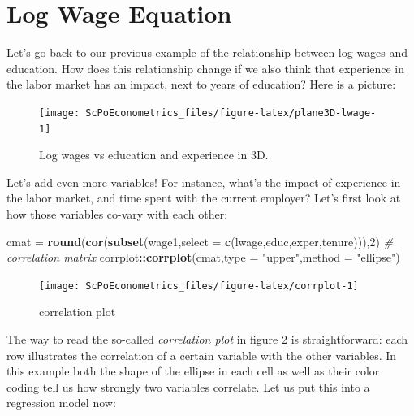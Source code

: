 \documentclass[]{book}
\newenvironment{Shaded}{\begin{snugshade}}{\end{snugshade}}
\newcommand{\KeywordTok}[1]{\textcolor[rgb]{0.13,0.29,0.53}{\textbf{#1}}}
\newcommand{\DataTypeTok}[1]{\textcolor[rgb]{0.13,0.29,0.53}{#1}}
\newcommand{\DecValTok}[1]{\textcolor[rgb]{0.00,0.00,0.81}{#1}}
\newcommand{\StringTok}[1]{\textcolor[rgb]{0.31,0.60,0.02}{#1}}
\newcommand{\CommentTok}[1]{\textcolor[rgb]{0.56,0.35,0.01}{\textit{#1}}}
\newcommand{\OperatorTok}[1]{\textcolor[rgb]{0.81,0.36,0.00}{\textbf{#1}}}
\newcommand{\NormalTok}[1]{#1}
\begin{document}
\section{Log Wage Equation}\label{log-wage-equation}

Let's go back to our previous example of the relationship between log
wages and education. How does this relationship change if we also think
that experience in the labor market has an impact, next to years of
education? Here is a picture:

\begin{figure}

{\centering \texttt{[image: ScPoEconometrics\_files/figure-latex/plane3D-lwage-1]} 

}

\caption{Log wages vs education and experience in 3D.}\label{fig:plane3D-lwage}
\end{figure}

Let's add even more variables! For instance, what's the impact of
experience in the labor market, and time spent with the current
employer? Let's first look at how those variables co-vary with each
other:

\begin{Shaded}
\begin{Highlighting}[]
\NormalTok{cmat =}\StringTok{ }\KeywordTok{round}\NormalTok{(}\KeywordTok{cor}\NormalTok{(}\KeywordTok{subset}\NormalTok{(wage1,}\DataTypeTok{select =} \KeywordTok{c}\NormalTok{(lwage,educ,exper,tenure))),}\DecValTok{2}\NormalTok{) }\CommentTok{# correlation matrix}
\NormalTok{corrplot}\OperatorTok{::}\KeywordTok{corrplot}\NormalTok{(cmat,}\DataTypeTok{type =} \StringTok{"upper"}\NormalTok{,}\DataTypeTok{method =} \StringTok{"ellipse"}\NormalTok{)}
\end{Highlighting}
\end{Shaded}

\begin{figure}

{\centering \texttt{[image: ScPoEconometrics\_files/figure-latex/corrplot-1]} 

}

\caption{correlation plot}\label{fig:corrplot}
\end{figure}

The way to read the so-called \emph{correlation plot} in figure
\ref{fig:corrplot} is straightforward: each row illustrates the
correlation of a certain variable with the other variables. In this
example both the shape of the ellipse in each cell as well as their
color coding tell us how strongly two variables correlate. Let us put
this into a regression model now:
\end{document}
